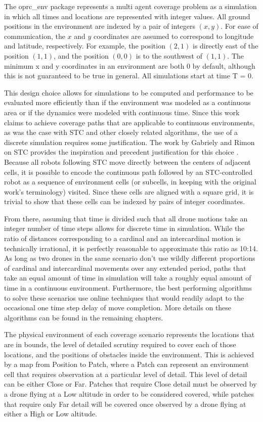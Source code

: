 The oprc\_env package represents a multi agent coverage problem as a simulation in which all times and locations are represented with integer values. All ground positions in the environment are indexed by a pair of integers $ (x, y) $. For ease of communication, the $x$ and $y$ coordinates are assumed to correspond to longitude and latitude, respectively. For example, the position $(2, 1)$ is directly east of the position $(1, 1)$, and the position $(0, 0)$ is to the southwest of $(1, 1)$. The minimum x and y coordinates in an environment are both 0 by default, although this is not guaranteed to be true in general. All simulations start at time T = 0.

This design choice allows for simulations to be computed and performance to be evaluated more efficiently than if the environment was modeled as a continuous area or if the dynamics were modeled with continuous time. Since this work claims to achieve coverage paths that are applicable to continuous environments, as was the case with STC and other closely related algorithms, the use of a discrete simulation requires some justification. The work by Gabriely and Rimon on STC provides the inspiration and precedent justification for this choice \cite{STC}. Because all robots following STC move directly between the centers of adjacent cells, it is possible to encode the continuous path followed by an STC-controlled robot as a sequence of environment cells (or subcells, in keeping with the original work's terminology) visited. Since these cells are aligned with a square grid, it is trivial to show that these cells can be indexed by pairs of integer coordinates.

From there, assuming that time is divided such that all drone motions take an integer number of time steps allows for discrete time in simulation. While the ratio of distances corresponding to a cardinal and an intercardinal motion is technically irrational, it is perfectly reasonable to approximate this ratio as 10:14. As long as two drones in the same scenario don't use wildly different proportions of cardinal and intercardinal movements over any extended period, paths that take an equal amount of time in simulation will take a roughly equal amount of time in a continuous environment. Furthermore, the best performing algorithms to solve these scenarios use online techniques that would readily adapt to the occasional one time step delay of move completion. More details on these algorithms can be found in the remaining chapters.

The physical environment of each coverage scenario represents the locations that are in bounds, the level of detailed scrutiny required to cover each of those locations, and the positions of obstacles inside the environment. This is achieved by a map from Position to Patch, where a Patch can represent an environment cell that requires observation at a particular level of detail. This level of detail can be either Close or Far. Patches that require Close detail must be observed by a drone flying at a Low altitude in order to be considered covered, while patches that require only Far detail will be covered once observed by a drone flying at either a High or Low altitude.

